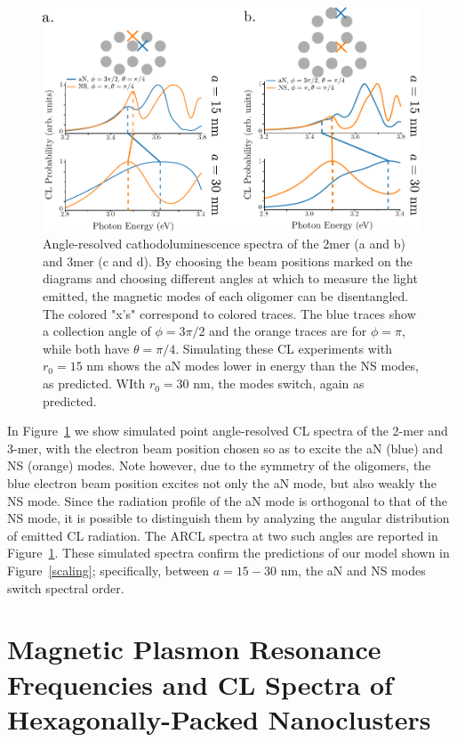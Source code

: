 \documentclass[journal=apchd5,manuscript=article]{achemso}
\begin{document}
\begin{figure}
\includegraphics{CL_incomplete.pdf}
\caption{Angle-resolved cathodoluminescence spectra of the 2mer (a and b) and 3mer (c and d). By choosing the beam positions marked on the diagrams and choosing different angles at which to measure the light emitted, the magnetic modes of each oligomer can be disentangled. The colored "x's" correspond to colored traces. The blue traces show a collection angle of $\phi = 3\pi/2$ and the orange traces are for $\phi = \pi$, while both have $\theta = \pi/4$. Simulating these CL experiments with $r_0 = 15$ nm shows the aN modes lower in energy than the NS modes, as predicted. WIth $r_0 = 30$ nm, the modes switch, again as predicted.}
\label{CL_2mer_3mer}
\end{figure}

In Figure~\ref{CL_2mer_3mer} we show simulated point angle-resolved CL spectra of the 2-mer and 3-mer, with the electron beam position chosen so as to excite the aN (blue) and NS (orange) modes. Note however, due to the symmetry of the oligomers, the blue electron beam position excites not only the aN mode, but also weakly the NS mode. Since the radiation profile of the aN mode is orthogonal to that of the NS mode, it is possible to distinguish them by analyzing the angular distribution of emitted CL radiation. The ARCL spectra at two such angles are reported in Figure~\ref{CL_2mer_3mer}. These simulated spectra confirm the predictions of our model shown in Figure~\ref{scaling}; specifically, between $a = 15 - 30$ nm, the aN and NS modes switch spectral order.

\section{Magnetic Plasmon Resonance Frequencies and CL Spectra of Hexagonally-Packed Nanoclusters}
\end{document}
